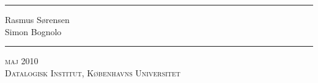 

%

\begin{titlingpage}
\newcommand{\HRule}{\rule{\linewidth}{1mm}}
\noindent\HRule
\begin{flushright}
                \large 
                Rasmus Sørensen\\
                Simon Bognolo
                \\[5mm]
            \huge \Title
\end{flushright}                
\HRule
{}
\begin{center}
\large\textsc{maj 2010}\\
\large\textsc{Datalogisk Institut, Københavns Universitet}
\end{center}
\end{titlingpage}

\frontmatter


\tableofcontents
\newpage

\listoffixmes
\newpage
\lstlistoflistings   
\newpage


%
\mainmatter
\DoubleSpacing
\selectfont 





 


\SingleSpacing
{}
\printbibliography
\newpage
\backmatter

\appendix




